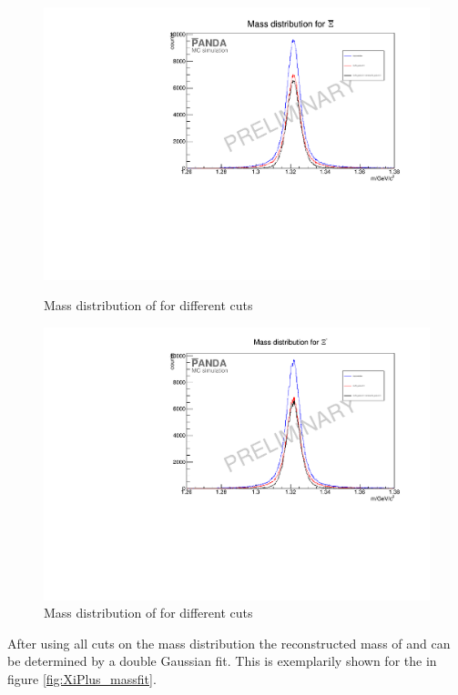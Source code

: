 		\begin{figure}
			\centering
				\includegraphics[width=1.1\textwidth]{./plots/Xi/XiPlus_m_diffcuts.pdf}
			\caption{\propose Mass distribution of \anticascade for different cuts}
			\label{fig:XiPlus_massdiffcuts}
			
				\includegraphics[width=1.1\textwidth]{./plots/Xi/XiMinus_m_diffcuts.pdf}
			\caption{\propose Mass distribution of \cascade for different cuts}
			\label{fig:XiMinus_massdiffcuts}
		\end{figure}
		
		After using all cuts on the mass distribution the reconstructed mass of \cascade and \anticascade can be determined by a double Gaussian fit.
		This is exemplarily shown for the \cascade in figure \ref{fig:XiPlus_massfit}.
		
